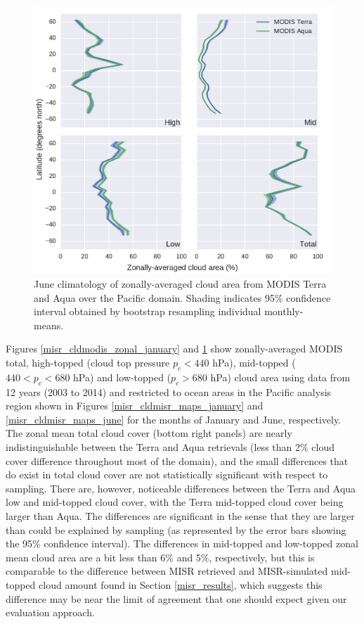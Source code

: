 \begin{figure}
\centering
\includegraphics[width=\columnwidth]{graphics/misr_cldmodis_zonal_2008-06.pdf}
\caption{June climatology of zonally-averaged cloud area from MODIS Terra and Aqua over the Pacific domain. Shading indicates 95\% confidence interval obtained by bootstrap resampling individual monthly-means.}
\label{misr_cldmodis_zonal_june}
\end{figure}

Figures \ref{misr_cldmodis_zonal_january} and \ref{misr_cldmodis_zonal_june} show zonally-averaged MODIS total, high-topped (cloud top pressure $p_c < 440$ hPa), mid-topped ($440 < p_c < 680$ hPa) and low-topped ($p_c > 680$ hPa) cloud area using data from 12 years (2003 to 2014) and restricted to ocean areas in the Pacific analysis region shown in Figures \ref{misr_cldmisr_maps_january} and \ref{misr_cldmisr_maps_june} for the months of January and June, respectively. The zonal mean total cloud cover (bottom right panels) are nearly indistinguishable between the Terra and Aqua retrievals (less than 2\% cloud cover difference throughout most of the domain), and the small differences that do exist in total cloud cover are not statistically significant with respect to sampling. There are, however, noticeable differences between the Terra and Aqua low and mid-topped cloud cover, with the Terra mid-topped cloud cover being larger than Aqua. The differences are significant in the sense that they are larger than could be explained by sampling (as represented by the error bars showing the 95\% confidence interval). The differences in mid-topped and low-topped zonal mean cloud area are a bit less than 6\% and 5\%, respectively, but this is comparable to the difference between MISR retrieved and MISR-simulated mid-topped cloud amount found in Section \ref{misr_results}, which suggests this difference may be near the limit of agreement that one should expect given our evaluation approach.

